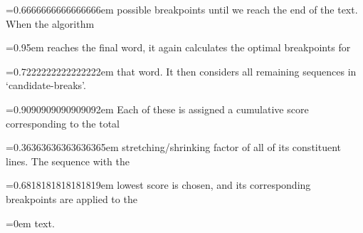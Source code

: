 \documentclass{article}
\begin{document}
 \font=0.6666666666666666em possible breakpoints until we reach the end of the text. When the algorithm 

 \font=0.95em reaches the final word, it again calculates the optimal breakpoints for 

 \font=0.7222222222222222em that word. It then considers all remaining sequences in `candidate-breaks'. 

 \font=0.9090909090909092em Each of these is assigned a cumulative score corresponding to the total 

 \font=0.36363636363636365em stretching/shrinking factor of all of its constituent lines. The sequence with the 

 \font=0.6818181818181819em lowest score is chosen, and its corresponding breakpoints are applied to the 

 \font=0em text.
\end{document}

